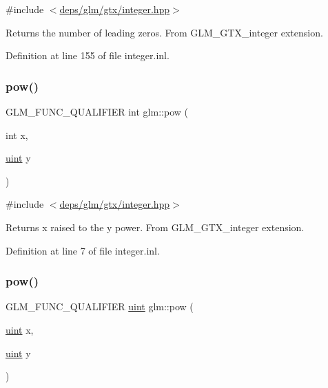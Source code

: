 {\ttfamily \#include $<$\hyperlink{gtx_2integer_8hpp}{deps/glm/gtx/integer.\+hpp}$>$}

Returns the number of leading zeros. From G\+L\+M\+\_\+\+G\+T\+X\+\_\+integer extension. 

Definition at line 155 of file integer.\+inl.

\mbox{\label{group__gtx__integer_ga4937910d5d82dfd9c4bab3da7ff75399}} 
\subsubsection{\texorpdfstring{pow()}{pow()}\hspace{0.1cm}{\footnotesize\ttfamily [1/2]}}
{\footnotesize\ttfamily G\+L\+M\+\_\+\+F\+U\+N\+C\+\_\+\+Q\+U\+A\+L\+I\+F\+I\+ER int glm\+::pow (\begin{DoxyParamCaption}\item[{int}]{x,  }\item[{\hyperlink{group__core__precision_ga4fd29415871152bfb5abd588334147c8}{uint}}]{y }\end{DoxyParamCaption})}



{\ttfamily \#include $<$\hyperlink{gtx_2integer_8hpp}{deps/glm/gtx/integer.\+hpp}$>$}

Returns x raised to the y power. From G\+L\+M\+\_\+\+G\+T\+X\+\_\+integer extension. 

Definition at line 7 of file integer.\+inl.

\mbox{\label{group__gtx__integer_gaa8229e850c3cc4ad83492fe390ada044}} 
\subsubsection{\texorpdfstring{pow()}{pow()}\hspace{0.1cm}{\footnotesize\ttfamily [2/2]}}
{\footnotesize\ttfamily G\+L\+M\+\_\+\+F\+U\+N\+C\+\_\+\+Q\+U\+A\+L\+I\+F\+I\+ER \hyperlink{group__core__precision_ga4fd29415871152bfb5abd588334147c8}{uint} glm\+::pow (\begin{DoxyParamCaption}\item[{\hyperlink{group__core__precision_ga4fd29415871152bfb5abd588334147c8}{uint}}]{x,  }\item[{\hyperlink{group__core__precision_ga4fd29415871152bfb5abd588334147c8}{uint}}]{y }\end{DoxyParamCaption})}



